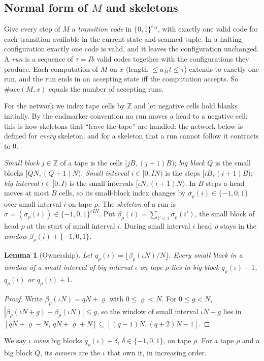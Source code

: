 \documentclass[11pt]{article}
\newtheorem{lemma}[theorem]{Lemma}
\theoremstyle{definition}
\theoremstyle{remark}
\newcommand{\acc}{\#\mathrm{acc}}
\begin{document}
\subsection{Normal form of $M$ and skeletons}\label{subsec:normal}
Give every step of $M$ a \emph{transition code} in $\{0,1\}^{e_M}$, with exactly one valid code for each transition available in
the current state and scanned tuple. In a halting configuration exactly one code is valid, and it leaves the configuration
unchanged. A \emph{run} is a sequence of $\tau=Ib$ valid codes together with the configurations they produce. Each computation of
$M$ on $x$ (length $\le a_Mt\le\tau$) extends to exactly one run, and the run ends in an accepting state iff the computation
accepts. So $\acc(M,x)$ equals the number of accepting runs.

For the network we index tape cells by $\mathbb Z$ and let negative cells hold blanks initially. By the endmarker convention no
run moves a head to a negative cell; this is how skeletons that ``leave the tape'' are handled: the network below is
defined for \emph{every} skeleton, and for a skeleton that a run cannot follow it contracts to $0$.

\emph{Small block} $j\in\mathbb Z$ of a tape is the cells $[jB,(j+1)B)$; \emph{big block} $Q$ is the small blocks
$[QN,(Q+1)N)$. \emph{Small interval} $i\in[0,IN)$ is the steps $[iB,(i+1)B)$; \emph{big interval} $\iota\in[0,I)$ is the small
intervals $[\iota N,(\iota+1)N)$. In $B$ steps a head moves at most $B$ cells, so its small-block index changes by
$\sigma_\rho(i)\in\{-1,0,1\}$ over small interval $i$ on tape $\rho$. The \emph{skeleton} of a run is
$\sigma=(\sigma_\rho(i))\in\{-1,0,1\}^{rIN}$. Put $\beta_\rho(i)=\sum_{i'<i}\sigma_\rho(i')$, the small block of head $\rho$ at
the start of small interval $i$. During small interval $i$ head $\rho$ stays in the \emph{window}
$\beta_\rho(i)+\{-1,0,1\}$.

\begin{lemma}[Ownership]\label{lem:own}
Let $q_\rho(\iota)=\lfloor\beta_\rho(\iota N)/N\rfloor$. Every small block in a window of a small interval of big interval
$\iota$ on tape $\rho$ lies in big block $q_\rho(\iota)-1$, $q_\rho(\iota)$ or $q_\rho(\iota)+1$.
\end{lemma}
\begin{proof}
Write $\beta_\rho(\iota N)=qN+\varrho$ with $0\le\varrho<N$. For $0\le g<N$, $|\beta_\rho(\iota N+g)-\beta_\rho(\iota N)|\le g$,
so the window of small interval $\iota N+g$ lies in $[qN+\varrho-N,\,qN+\varrho+N]\subseteq[(q-1)N,(q+2)N-1]$.
\end{proof}
We say $\iota$ \emph{owns} big blocks $q_\rho(\iota)+\delta$, $\delta\in\{-1,0,1\}$, on tape $\rho$. For a tape $\rho$ and a big
block $Q$, its \emph{owners} are the $\iota$ that own it, in increasing order.
\end{document}
